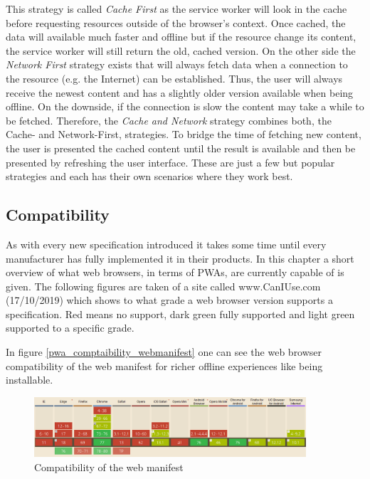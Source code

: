 This strategy is called \textit{Cache First} as the service worker will look in the cache before requesting resources outside of the browser’s context. Once cached, the data will available much faster and offline but if the resource change its content, the service worker will still return the old, cached version. On the other side the \textit{Network First} strategy exists that will always fetch data when a connection to the resource (e.g. the Internet) can be established. Thus, the user will always receive the newest content and has a slightly older version available when being offline. On the downside, if the connection is slow the content may take a while to be fetched. Therefore, the \textit{Cache and Network} strategy combines both, the Cache- and Network-First, strategies. To bridge the time of fetching new content, the user is presented the cached content until the result is available and then be presented by refreshing the user interface. These are just a few but popular strategies and each has their own scenarios where they work best. \cite[pp. 109-111]{hajianProgressiveWebApps2019}

\subsection{Compatibility}
\label{sec:theorieCd}


As with every new specification introduced it takes some time until every manufacturer has fully implemented it in their products. In this chapter a short overview of what web browsers, in terms of PWAs, are currently capable of is given. The following figures are taken  of a site called www.CanIUse.com (17/10/2019) which shows to what grade a web browser version supports a  specification. Red means no support, dark green fully supported and light green supported to a specific grade.

In figure \ref{pwa_comptaibility_webmanifest} one can see the web browser compatibility of the web manifest for richer offline experiences like being installable.

\begin{figure}[htbp] 
	\centering
	\includegraphics[width=0.9\textwidth]{Assets/chapter_pwa/webmanifestsupport.PNG}
	\caption{Compatibility of the web manifest}
	\label{fig:pwa_comptaibility_webmanifest}
\end{figure}



